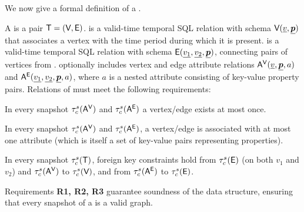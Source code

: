 We now give a formal definition of a \tg.

\begin{definition}[TGraph]
A \tg is a pair $\mathsf{T}=(\textsf{V}, \textsf{E})$. \tv is a valid-time temporal SQL
relation with schema $\textsf{V}(\underline{v}, \underline{\boldsymbol{p}})$ that
associates a vertex with the time period during which it is
present. \te is a valid-time temporal SQL relation with schema
$\textsf{E}(\underline{v_1}, \underline{v_2}, \underline{\boldsymbol{p}})$, connecting
pairs of vertices from \tv.  
%
\tve optionally includes vertex and edge attribute relations
$\mathsf{A^{V}}(\underline{v}, \underline{\boldsymbol{p}}, a)$ and $\mathsf{A^{E}}(\underline{v_1},
\underline{v_2}, \underline{\boldsymbol{p}}, a)$, where $a$ is a nested attribute
consisting of key-value property pairs.
%
Relations of \tve must meet the following requirements:

\begin{description}[noitemsep]
\item [R1: Unique vertices/ edges] In every snapshot $\tau^s_c (\mathsf{A^{V}})$
  and $\tau^s_c (\mathsf{A^{E}})$ a vertex/edge exists at most once.
\item [R2: Unique attribute values] In every snapshot $\tau^s_c
  (\mathsf{A^{V}})$ and $\tau^s_c (\mathsf{A^{E}})$, a vertex/edge is associated with at
  most one attribute (which is itself a set of key-value pairs
  representing properties).
\item [R3: Referential integrity] In every snapshot $\tau^s_c (\mathsf{T})$,
  foreign key constraints hold from $\tau^s_c (\textsf{E})$ (on both $v_1$
  and $v_2$) and $\tau^s_c (\mathsf{A^{V}})$ to $\tau^s_c (\textsf{V})$, and from
  $\tau^s_c (\mathsf{A^{E}})$ to $\tau^s_c (\textsf{E})$.
\end{description}
\label{def:tg}
\vspace{-0.5cm}
\end{definition}

Requirements {\bf R1, R2, R3} guarantee soundness of the \tg data
structure, ensuring that every snapshot of a \tg is a valid graph.
 

